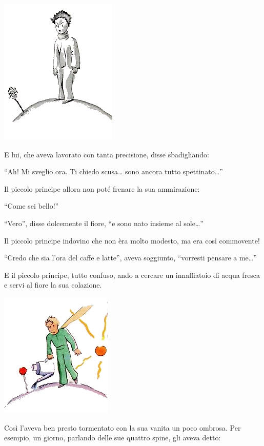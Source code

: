 \documentclass[11pt]{scrbook}
\begin{document}
\begin{center}
\includegraphics{img/8a}
\end{center}

E lui, che aveva lavorato con tanta precisione, disse sbadigliando:

``Ah! Mi sveglio ora. Ti chiedo scusa\ldots{} sono ancora tutto
spettinato\ldots{}''

Il piccolo principe allora non poté frenare la sua ammirazione:

``Come sei bello!''

``Vero'', disse dolcemente il fiore, ``e sono nato insieme al
sole\ldots{}''

Il piccolo principe indovino che non èra molto modesto, ma era così
commovente!

``Credo che sia l'ora del caffe e latte'', aveva soggiunto, ``vorresti
pensare a me\ldots{}''

E il piccolo principe, tutto confuso, ando a cercare un innaffiatoio di
acqua fresca e servi al fiore la sua colazione.

\begin{center}
\includegraphics{img/8b}
\end{center}

Così l'aveva ben presto tormentato con la sua vanita un poco ombrosa.
Per esempio, un giorno, parlando delle sue quattro spine, gli aveva
detto:
\end{document}
